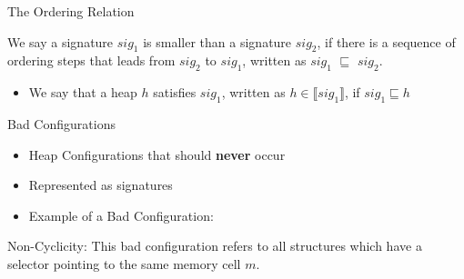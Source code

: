 \begin{frame}[fragile]{The Ordering Relation}
    
    \pause

    \begin{definition}
        We say a signature $sig_1$ is smaller than a signature $sig_2$, if there is a sequence of 
        ordering steps that leads from $sig_2$ to $sig_1$, written as $sig_1$ $\sqsubseteq$ $sig_2$.
    \end{definition}

    \pause

    \begin{itemize}
        \item <3-> We say that a heap $h$ satisfies $sig_1$, written as $h \in \llbracket sig_1 \rrbracket$, if $sig_1 \sqsubseteq h$
    \end{itemize}

\end{frame}

\begin{frame}[fragile]{Bad Configurations}
    
    \pause

    \begin{itemize}
        \item <2-> Heap Configurations that should \textbf{never} occur
        \item <3-> Represented as signatures
        \item <4-> Example of a Bad Configuration:
    \end{itemize} 

    \pause 

    \pause

    \pause

    \medskip
    \medskip

    \medskip

    Non-Cyclicity: This bad configuration refers to all structures which have a selector pointing to the same memory cell $m$.

    \pause

    \begin{center}
            \qquad
    \end{center}
\end{frame}

